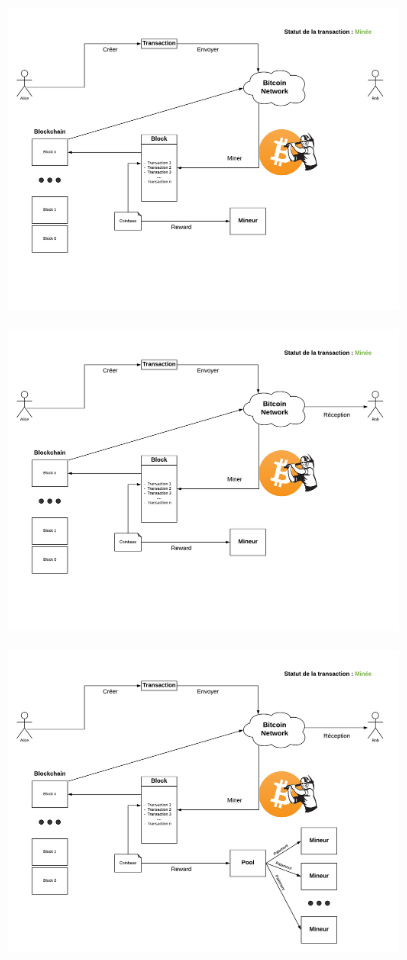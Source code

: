 \documentclass{beamer}
\begin{document}
\begin{frame}
    \begin{center}
        \includegraphics[height=8cm]{images/explanation-6.png}
    \end{center}
\end{frame}

\begin{frame}
    \begin{center}
        \includegraphics[height=8cm]{images/explanation-7.png}
    \end{center}
\end{frame}

\begin{frame}
    \begin{center}
        \includegraphics[height=8cm]{images/explanation-8.png}
    \end{center}
\end{frame}
\end{document}
